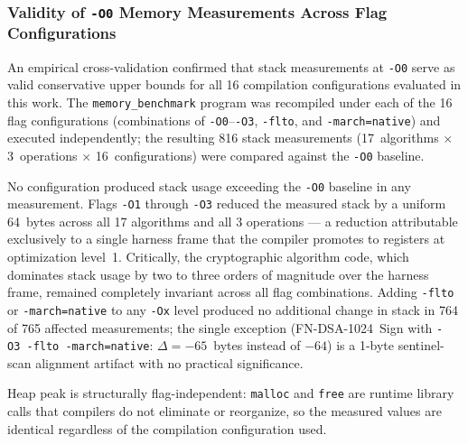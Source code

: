 \documentclass[12pt]{article}
\begin{document}
\subsubsection{Validity of \texttt{-O0} Memory Measurements Across Flag Configurations}
\label{subsec:flags-memoria}

An empirical cross-validation confirmed that stack measurements at
\texttt{-O0} serve as valid conservative upper bounds for all 16 compilation
configurations evaluated in this work. The \texttt{memory\_benchmark} program
was recompiled under each of the 16 flag configurations (combinations of
\texttt{-O0}--\texttt{-O3}, \texttt{-flto}, and \texttt{-march=native})
and executed independently; the resulting 816 stack measurements
(17~algorithms $\times$ 3~operations $\times$ 16~configurations) were
compared against the \texttt{-O0} baseline.

No configuration produced stack usage exceeding the \texttt{-O0} baseline
in any measurement. Flags \texttt{-O1} through \texttt{-O3} reduced the
measured stack by a uniform 64~bytes across all 17 algorithms and all 3
operations --- a reduction attributable exclusively to a single harness
frame that the compiler promotes to registers at optimization level~1.
Critically, the cryptographic algorithm code, which dominates stack usage
by two to three orders of magnitude over the harness frame, remained
completely invariant across all flag combinations. Adding
\texttt{-flto} or \texttt{-march=native} to any \texttt{-Ox} level
produced no additional change in stack in 764 of 765 affected measurements;
the single exception (FN-DSA-1024~Sign with \texttt{-O3~-flto~-march=native}:
$\Delta = -65$~bytes instead of $-64$) is a 1-byte sentinel-scan alignment
artifact with no practical significance.

Heap peak is structurally flag-independent: \texttt{malloc} and \texttt{free}
are runtime library calls that compilers do not eliminate or reorganize,
so the measured values are identical regardless of the compilation
configuration used.
\end{document}
